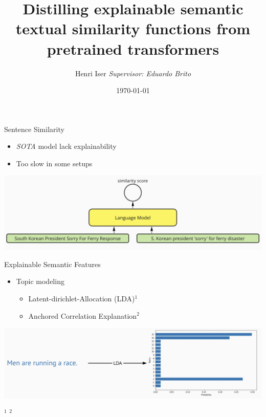 \documentclass[10pt, compress]{beamer}
\title{Distilling explainable semantic textual similarity functions from pretrained transformers}
\date{\today}
\author{Henri Iser \hfill\textit{Supervisor: Eduardo Brito}}
\institute{University of Bonn}
\begin{document}
\maketitle



\begin{frame}{Sentence Similarity}
\begin{itemize}
	\item \textit{SOTA} model lack explainability
	\item Too slow in some setups
\end{itemize}
\vfill\centering
\includegraphics[width=.9\textwidth]{gfx/Similarity}
\end{frame}


\begin{frame}[t]{Explainable Semantic Features}
\begin{itemize}
	\item Topic modeling
	\begin{itemize}
		\item Latent-dirichlet-Allocation (LDA)$^1$
		\item Anchored Correlation Explanation$^2$
	\end{itemize}
\end{itemize}
{\centering
\vfill
\includegraphics[width=\textwidth]{gfx/LDA}
}
\vfill{}
{\tiny\raggedright
$^1$ \cite{10.5555/944919.944937}
$^2$ \cite{TACL1244}
}
\end{frame}
\end{document}
